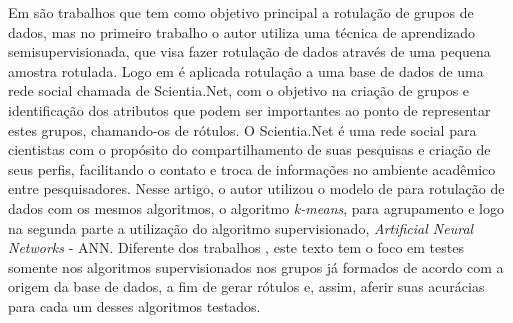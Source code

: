 Em \cite{Metodo2015,DeLima2015} são trabalhos que tem como objetivo principal a rotulação de grupos de dados, mas no primeiro trabalho o autor utiliza uma técnica de aprendizado semisupervisionada, que visa fazer rotulação de dados através de uma pequena amostra rotulada. Logo em \cite{DeLima2015} é aplicada rotulação a uma base de dados de uma rede social chamada de Scientia.Net, com o objetivo na criação de grupos e identificação dos atributos que podem ser importantes ao ponto de representar estes grupos, chamando-os de rótulos. O Scientia.Net é uma rede social para cientistas com o propósito do compartilhamento de suas pesquisas e criação de seus perfis, facilitando o contato e troca de informações no ambiente acadêmico entre pesquisadores. Nesse artigo, o autor utilizou o modelo de \cite{Lopes2016} para rotulação de dados com os mesmos algoritmos, o algoritmo \textit{k-means}, para agrupamento e logo na segunda parte a utilização do algoritmo supervisionado, \textit{Artificial Neural Networks} - ANN. Diferente dos trabalhos \cite{Metodo2015,DeLima2015}, este texto tem o foco em testes somente nos algoritmos supervisionados nos grupos já formados de acordo com a origem da base de dados, a fim de gerar rótulos e, assim, aferir suas acurácias para cada um desses algoritmos testados. 
% 
% 
% 
% 

